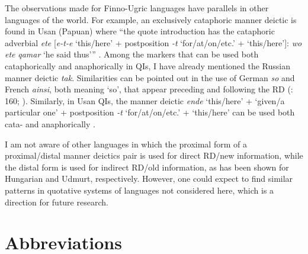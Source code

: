 \documentclass[output=paper,colorlinks,citecolor=brown]{langscibook}
\begin{document}
The observations made for Finno-Ugric languages have parallels in other languages of the world. For example, an exclusively cataphoric manner deictic is found in Usan (Papuan) where “the quote introduction has the cataphoric adverbial \textit{ete} [\textit{e-t-e} ‘this/here’ + postposition \textit{-t} ‘for/at/on/etc.’ + ‘this/here’]: \textit{wo} \textit{ete} \textit{qamar} ‘he said thus’” \citep[218]{Reesink1993}. Among the markers that can be used both cataphorically and anaphorically in QIs, I have already mentioned the Russian manner deictic \textit{tak}. Similarities can be pointed out in the use of German \textit{so} and French \textit{ainsi}, both meaning ‘so’, that appear preceding and following the RD (\citealt{König2017}: 160; \citealt{KarssenbergLahousse2018}). Similarly, in Usan QIs, the manner deictic \textit{ende} ‘this/here’ + ‘given/a particular one’ + postposition \textit{-t} ‘for/at/on/etc.’ + ‘this/here’ can be used both cata- and anaphorically \citep[218]{Reesink1993}.

I am not aware of other languages in which the proximal form of a proximal/distal manner deictics pair is used for direct RD/new information, while the distal form is used for indirect RD/old information, as has been shown for Hungarian and Udmurt, respectively. However, one could expect to find similar patterns in quotative systems of languages not considered here, which is a direction for future research.

\section*{Abbreviations}
\end{document}
